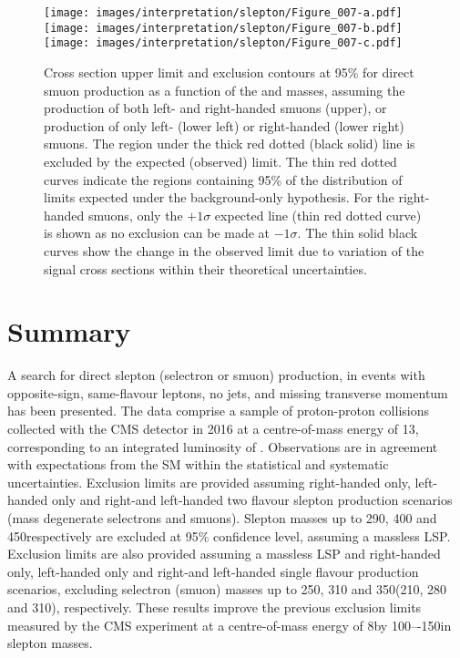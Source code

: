  \begin{figure}[htbp]
\centering
\texttt{[image: images/interpretation/slepton/Figure\_007-a.pdf]} \\
\texttt{[image: images/interpretation/slepton/Figure\_007-b.pdf]}
\texttt{[image: images/interpretation/slepton/Figure\_007-c.pdf]}
\caption{\label{fig:TOTmm}
Cross section upper limit and exclusion contours at 95\% \CL for direct smuon production
as a function of the \lsp and \slep masses, assuming the production of both left- and right-handed smuons
(upper), or production of only left- (lower left) or right-handed (lower right) smuons.
The region under the thick red dotted (black solid) line is excluded by the expected (observed) limit.
The thin red dotted curves indicate the regions containing 95\% of the distribution of limits
expected under the background-only hypothesis. For the right-handed smuons, only the $+1\sigma$ expected line (thin red dotted curve) is shown as no exclusion can be made at $-1\sigma$.
The thin solid black curves show the change in the observed limit due to
variation of the signal cross sections within their theoretical uncertainties.
}
\end{figure}
\section{Summary}
\noindent
\justify
A search for direct slepton (selectron or smuon) production, in events with opposite-sign, same-flavour leptons, no jets, and missing transverse momentum has been presented.
The data comprise a sample of proton-proton collisions collected with the CMS detector in 2016 at a centre-of-mass energy of 13\TeV, corresponding to an integrated luminosity of \lint.
Observations are in agreement with expectations from the SM within the statistical and systematic uncertainties.
Exclusion limits are provided assuming right-handed only, left-handed only and right-and left-handed two flavour slepton production scenarios (mass degenerate selectrons and smuons).
Slepton masses up to 290, 400 and 450\GeV respectively are excluded at 95\% confidence level, assuming a massless LSP. 
Exclusion limits are also provided assuming a massless LSP and right-handed only, left-handed only and right-and left-handed single flavour production scenarios, excluding selectron (smuon) masses up to 250, 310 and 350\GeV (210, 280 and 310\GeV), respectively.
These results improve the previous exclusion limits measured by the CMS experiment at a centre-of-mass energy of 8\TeV by 100–-150\GeV in slepton masses.
